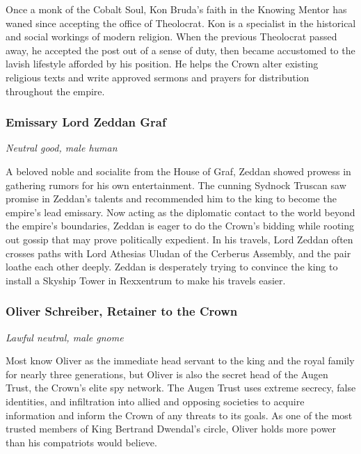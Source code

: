 \documentclass[10pt,a4paper,twoside,bg=print,twocolumn,openany,nodeprecatedcode]{dndbook}
\begin{document}
Once a monk of the Cobalt Soul, Kon Bruda's faith in the Knowing Mentor has waned since accepting the office of Theolocrat. Kon is a specialist in the historical and social workings of modern religion. When the previous Theolocrat passed away, he accepted the post out of a sense of duty, then became accustomed to the lavish lifestyle afforded by his position. He helps the Crown alter existing religious texts and write approved sermons and prayers for distribution throughout the empire.

\subsubsection{Emissary Lord Zeddan Graf}
\textit{Neutral good, male human}

A beloved noble and socialite from the House of Graf, Zeddan showed prowess in gathering rumors for his own entertainment. The cunning Sydnock Truscan saw promise in Zeddan's talents and recommended him to the king to become the empire's lead emissary. Now acting as the diplomatic contact to the world beyond the empire's boundaries, Zeddan is eager to do the Crown's bidding while rooting out gossip that may prove politically expedient. In his travels, Lord Zeddan often crosses paths with Lord Athesias Uludan of the Cerberus Assembly, and the pair loathe each other deeply. Zeddan is desperately trying to convince the king to install a Skyship Tower in Rexxentrum to make his travels easier.

\subsubsection{Oliver Schreiber, Retainer to the Crown}
\textit{Lawful neutral, male gnome}

Most know Oliver as the immediate head servant to the king and the royal family for nearly three generations, but Oliver is also the secret head of the Augen Trust, the Crown's elite spy network. The Augen Trust uses extreme secrecy, false identities, and infiltration into allied and opposing societies to acquire information and inform the Crown of any threats to its goals. As one of the most trusted members of King Bertrand Dwendal's circle, Oliver holds more power than his compatriots would believe.
\end{document}
